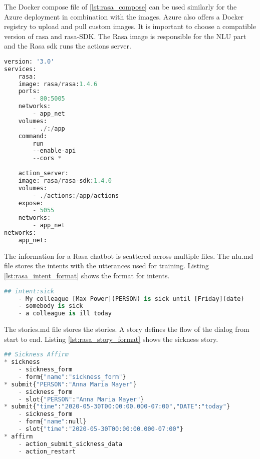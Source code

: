 The Docker compose file of \ref{lst:rasa_compose} can be used similarly for the Azure deployment in combination with the images.
Azure also offers a Docker registry to upload and pull custom images.
It is important to choose a compatible version of rasa and rasa-SDK.
The Rasa image is responsible for the NLU part and the Rasa sdk runs the 
actions server.
\begin{lstlisting}[caption={Rasa Docker Compose File}, label={lst:rasa_compose},captionpos=b,frame=single,language={Python},commentstyle=\color{mygreen},keywordstyle=\color{blue},
    morekeywords={}]                
version: '3.0'
services:
    rasa:
    image: rasa/rasa:1.4.6
    ports:
        - 80:5005
    networks: 
        - app_net
    volumes:
        - ./:/app
    command:
        run 
        --enable-api
        --cors *
    
    action_server:
    image: rasa/rasa-sdk:1.4.0    
    volumes:
        - ./actions:/app/actions
    expose: 
        - 5055
    networks: 
        - app_net
networks: 
    app_net:
\end{lstlisting}  
The information for a Rasa chatbot is scattered across multiple files.
The nlu.md file stores the intents with the utterances used for training.
Listing \ref{lst:rasa_intent_format} shows the format for intents.
\begin{lstlisting}[caption={Rasa Intent Format}, label={lst:rasa_intent_format},captionpos=b,frame=single,language={Python},commentstyle=\color{mygreen},keywordstyle=\color{blue},
    morekeywords={}]                
## intent:sick
    - My colleague [Max Power](PERSON) is sick until [Friday](date)
    - somebody is sick 
    - a colleague is ill today
\end{lstlisting} 
The stories.md file stores the stories. 
A story defines the flow of the dialog from start to end.
Listing \ref{lst:rasa_story_format} shows the sickness story.
\begin{lstlisting}[caption={Rasa Story Format}, label={lst:rasa_story_format},captionpos=b,frame=single,language={Python},commentstyle=\color{mygreen},keywordstyle=\color{blue},
    morekeywords={sickness, submit, affirm}]                
## Sickness Affirm
* sickness
    - sickness_form
    - form{"name":"sickness_form"}
* submit{"PERSON":"Anna Maria Mayer"}
    - sickness_form
    - slot{"PERSON":"Anna Maria Mayer"}
* submit{"time":"2020-05-30T00:00:00.000-07:00","DATE":"today"}
    - sickness_form
    - form{"name":null}
    - slot{"time":"2020-05-30T00:00:00.000-07:00"}
* affirm
    - action_submit_sickness_data
    - action_restart
\end{lstlisting} 
